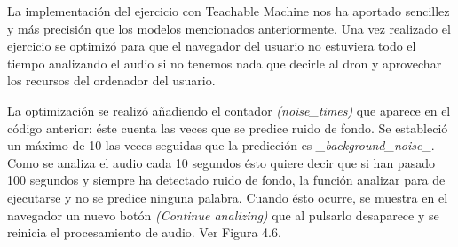 La implementación del ejercicio con Teachable Machine  nos ha aportado sencillez y más precisión que los modelos mencionados anteriormente.
Una vez realizado el ejercicio se optimizó para que el navegador del usuario no estuviera todo el tiempo analizando el  audio si no tenemos nada que decirle al dron y aprovechar los recursos del ordenador del usuario.

La optimización se realizó añadiendo el contador \textit{(noise\_times)} que aparece en el código anterior: éste cuenta las veces que se predice ruido de fondo. Se estableció un máximo de 10 las veces seguidas que la predicción es \textit{\_background\_noise\_}. Como se analiza el audio cada 10 segundos ésto quiere decir que si han pasado 100 segundos y siempre ha detectado ruido de fondo, la función analizar para de ejecutarse y no se predice ninguna palabra. Cuando ésto ocurre, se muestra en el navegador un nuevo botón \textit{(Continue analizing)} que al pulsarlo desaparece y se reinicia el procesamiento de audio. Ver Figura 4.6.

